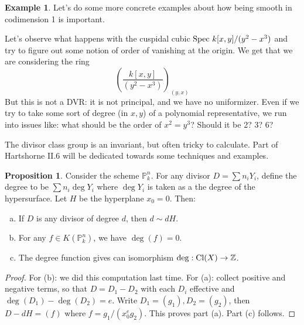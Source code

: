 \documentclass[10pt,reqno]{amsart}
\theoremstyle{definition}
\newtheorem{example}[theorem]{Example}
\newtheorem{proposition}[theorem]{Proposition}
\theoremstyle{remark}
\numberwithin{equation}{section}
\numberwithin{theorem}{section}
\newcommand{\Z}{{\mathbb Z}}
\newcommand{\spec}{\textup{Spec }}
\newcommand{\cl}{\textup{Cl}}
\newcommand{\PP}{{\mathbb P}}
\begin{document}
\begin{example} Let's do some more concrete examples about how being smooth in codimension 1 is important. %

Let's observe what happens with the cuspidal cubic $\spec k[x,y]/(y^2-x^3)$ and try to figure out some notion of order of vanishing at the origin. We get that we are considering the ring
\[\left(\frac{k[x,y]}{(y^2-x^3)}\right)_{(y,x)}\]
But this is not a DVR: it is not principal, and we have no uniformizer. Even if we try to take some sort of degree (in $x,y$) of a polynomial representative, we run into issues like: what should be the order of $x^2 = y^3$? Should it be 2? 3? 6?
\end{example}

The divisor class group is an invariant, but often tricky to calculate. Part of Hartshorne II.6 will be dedicated towards some techniques and examples.

\begin{proposition} Consider the scheme $\PP^n_k$. For any divisor $D = \sum n_i Y_i$, define the degree to be $\sum n_i \deg Y_i$ where $\deg Y_i$ is taken as a the degree of the hypersurface. Let $H$ be the hyperplane $x_0 = 0$. Then:
\begin{enumerate}[(a)]
\item If $D$ is any divisor of degree $d$, then $d \sim dH$.
\item For any $f \in K(\PP^n_k)$, we have $\deg(f) = 0$.
\item The degree function gives can isomorphism $\deg: \cl(X) \to \Z$.
\end{enumerate}
\end{proposition}
\begin{proof}
For (b): we did this computation last time. For (a): collect positive and negative terms, so that $D = D_1 - D_2$ with each $D_i$ effective and $\deg(D_1) - \deg(D_2) = e$. Write $D_1 = (g_1), D_2 = (g_2)$, then $D - dH = (f)$ where $f = g_1/(x_0^eg_2)$. This proves part (a). Part (c) follows.
\end{proof}
\end{document}
